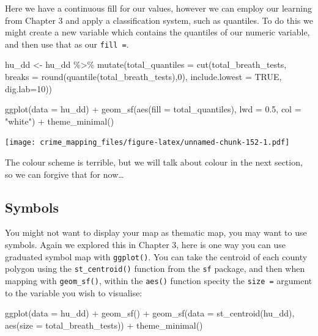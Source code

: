 \documentclass[
]{book}
\newenvironment{Shaded}{\begin{snugshade}}{\end{snugshade}}
\newcommand{\AttributeTok}[1]{\textcolor[rgb]{0.77,0.63,0.00}{#1}}
\newcommand{\ConstantTok}[1]{\textcolor[rgb]{0.00,0.00,0.00}{#1}}
\newcommand{\DecValTok}[1]{\textcolor[rgb]{0.00,0.00,0.81}{#1}}
\newcommand{\FloatTok}[1]{\textcolor[rgb]{0.00,0.00,0.81}{#1}}
\newcommand{\FunctionTok}[1]{\textcolor[rgb]{0.00,0.00,0.00}{#1}}
\newcommand{\NormalTok}[1]{#1}
\newcommand{\OtherTok}[1]{\textcolor[rgb]{0.56,0.35,0.01}{#1}}
\newcommand{\SpecialCharTok}[1]{\textcolor[rgb]{0.00,0.00,0.00}{#1}}
\newcommand{\StringTok}[1]{\textcolor[rgb]{0.31,0.60,0.02}{#1}}
\begin{document}
Here we have a continuous fill for our values, however we can employ our learning from Chapter 3 and apply a classification system, such as quantiles. To do this we might create a new variable which contains the quantiles of our numeric variable, and then use that as our \texttt{fill\ =}.

\begin{Shaded}
\begin{Highlighting}[]
\NormalTok{hu\_dd }\OtherTok{\textless{}{-}}\NormalTok{ hu\_dd }\SpecialCharTok{\%\textgreater{}\%} 
  \FunctionTok{mutate}\NormalTok{(}\AttributeTok{total\_quantiles =} \FunctionTok{cut}\NormalTok{(total\_breath\_tests, }\AttributeTok{breaks =} \FunctionTok{round}\NormalTok{(}\FunctionTok{quantile}\NormalTok{(total\_breath\_tests),}\DecValTok{0}\NormalTok{), }\AttributeTok{include.lowest =} \ConstantTok{TRUE}\NormalTok{, }\AttributeTok{dig.lab=}\DecValTok{10}\NormalTok{))}


\FunctionTok{ggplot}\NormalTok{(}\AttributeTok{data =}\NormalTok{ hu\_dd) }\SpecialCharTok{+} 
  \FunctionTok{geom\_sf}\NormalTok{(}\FunctionTok{aes}\NormalTok{(}\AttributeTok{fill =}\NormalTok{ total\_quantiles), }\AttributeTok{lwd =} \FloatTok{0.5}\NormalTok{, }\AttributeTok{col =} \StringTok{"white"}\NormalTok{) }\SpecialCharTok{+} 
  \FunctionTok{theme\_minimal}\NormalTok{()}
\end{Highlighting}
\end{Shaded}

\texttt{[image: crime\_mapping\_files/figure-latex/unnamed-chunk-152-1.pdf]}

The colour scheme is terrible, but we will talk about colour in the next section, so we can forgive that for now\ldots{}

\hypertarget{symbols}{%
\subsection{Symbols}\label{symbols}}

You might not want to display your map as thematic map, you may want to use symbols. Again we explored this in Chapter 3, here is one way you can use graduated symbol map with \texttt{ggplot()}. You can take the centroid of each county polygon using the \texttt{st\_centroid()} function from the \texttt{sf} package, and then when mapping with \texttt{geom\_sf()}, within the \texttt{aes()} function specity the \texttt{size\ =} argument to the variable you wish to visualise:

\begin{Shaded}
\begin{Highlighting}[]
\FunctionTok{ggplot}\NormalTok{(}\AttributeTok{data =}\NormalTok{ hu\_dd) }\SpecialCharTok{+} 
  \FunctionTok{geom\_sf}\NormalTok{() }\SpecialCharTok{+} 
  \FunctionTok{geom\_sf}\NormalTok{(}\AttributeTok{data =} \FunctionTok{st\_centroid}\NormalTok{(hu\_dd), }\FunctionTok{aes}\NormalTok{(}\AttributeTok{size =}\NormalTok{ total\_breath\_tests)) }\SpecialCharTok{+} 
  \FunctionTok{theme\_minimal}\NormalTok{()}
\end{Highlighting}
\end{Shaded}
\end{document}
